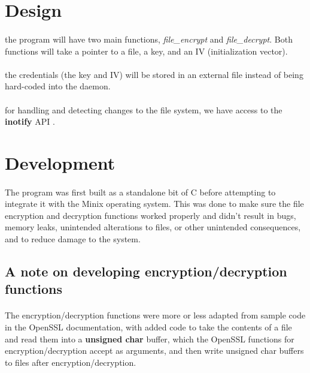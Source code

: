 \documentclass{article}
\begin{document}
\section{Design}
    \paragraph{}the program will have two main functions, \textit{file\_encrypt} and \textit{file\_decrypt}. Both functions will take a pointer to a file, a key, and an IV (initialization vector).
    \paragraph{}the credentials (the key and IV) will be stored in an external file instead of being hard-coded into the daemon.
    \paragraph{}for handling and detecting changes to the file system, we have access to the \textbf{inotify} API \parencite{inotify_manpage}.
    

\section{Development}
    \paragraph{}The program was first built as a standalone bit of C before attempting to integrate it with the Minix operating system. This was done to make sure the file encryption and decryption functions worked properly and didn't result in bugs, memory leaks, unintended alterations to files, or other unintended consequences, and to reduce damage to the system.

    \subsection{A note on developing encryption/decryption functions}
        \paragraph{}The encryption/decryption functions were more or less adapted from sample code in the OpenSSL documentation, with added code to take the contents of a file and read them into a \textbf{unsigned char} buffer, which the OpenSSL functions for encryption/decryption accept as arguments, and then write unsigned char buffers to files after encryption/decryption.
\end{document}
